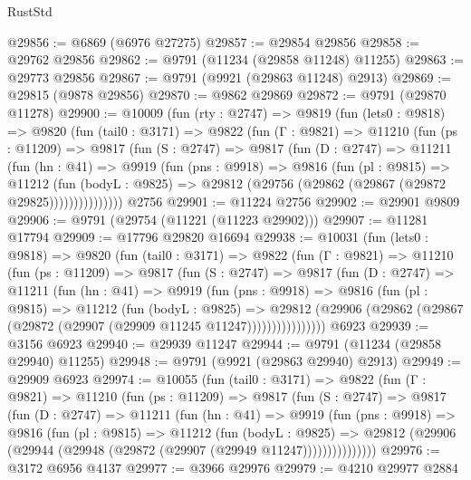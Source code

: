 \begin{lexlean}{RustStd}
\begin{coremodule}
@29856 := @6869 (@6976 @27275)
@29857 := @29854 @29856
@29858 := @29762 @29856
@29862 := @9791 (@11234 (@29858 @11248) @11255)
@29863 := @29773 @29856
@29867 := @9791 (@9921 (@29863 @11248) @2913)
@29869 := @29815 (@9878 @29856)
@29870 := @9862 @29869
@29872 := @9791 (@29870 @11278)
@29900 := @10009
    (fun (rty : @2747) =>
    @9819
      (fun (lets0 : @9818) =>
      @9820
        (fun (tail0 : @3171) =>
        @9822
          (fun (Γ : @9821) =>
          @11210
            (fun (ps : @11209) =>
            @9817
              (fun (S : @2747) =>
              @9817
                (fun (D : @2747) =>
                @11211
                  (fun (hn : @41) =>
                  @9919
                    (fun (pns : @9918) =>
                    @9816
                      (fun (pl : @9815) =>
                      @11212
                        (fun (bodyL : @9825) =>
                        @29812 (@29756 (@29862 (@29867 (@29872 @29825)))))))))))))))
    @2756
@29901 := @11224 @2756
@29902 := @29901 @9809
@29906 := @9791 (@29754 (@11221 (@11223 @29902)))
@29907 := @11281 @17794
@29909 := @17796 @29820 @16694
@29938 := @10031
    (fun (lets0 : @9818) =>
    @9820
      (fun (tail0 : @3171) =>
      @9822
        (fun (Γ : @9821) =>
        @11210
          (fun (ps : @11209) =>
          @9817
            (fun (S : @2747) =>
            @9817
              (fun (D : @2747) =>
              @11211
                (fun (hn : @41) =>
                @9919
                  (fun (pns : @9918) =>
                  @9816
                    (fun (pl : @9815) =>
                    @11212
                      (fun (bodyL : @9825) =>
                      @29812
                        (@29906
                          (@29862 (@29867 (@29872 (@29907 (@29909 @11245 @11247))))))))))))))))
    @6923
@29939 := @3156 @6923
@29940 := @29939 @11247
@29944 := @9791 (@11234 (@29858 @29940) @11255)
@29948 := @9791 (@9921 (@29863 @29940) @2913)
@29949 := @29909 @6923
@29974 := @10055
    (fun (tail0 : @3171) =>
    @9822
      (fun (Γ : @9821) =>
      @11210
        (fun (ps : @11209) =>
        @9817
          (fun (S : @2747) =>
          @9817
            (fun (D : @2747) =>
            @11211
              (fun (hn : @41) =>
              @9919
                (fun (pns : @9918) =>
                @9816
                  (fun (pl : @9815) =>
                  @11212
                    (fun (bodyL : @9825) =>
                    @29812 (@29906 (@29944 (@29948 (@29872 (@29907 (@29949 @11247)))))))))))))))
@29976 := @3172 @6956 @4137
@29977 := @3966 @29976
@29979 := @4210 @29977 @2884

\end{coremodule}
\end{lexlean}
